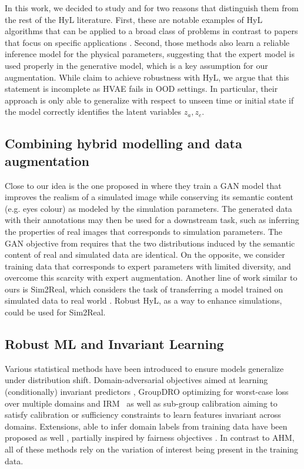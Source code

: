 In this work, we decided to study \citet{APHYNITY} and \citet{HVAE} for two reasons that distinguish them from the rest of the HyL literature. First, these are notable examples of HyL algorithms that can be applied to a broad class of problems in contrast to papers that focus on specific applications \citep{hl_2,hl_3}. Second, those methods also learn a reliable inference model for the physical parameters, suggesting that the expert model is used properly in the generative model, which is a key assumption for our augmentation. While \citet{HVAE} claim to achieve robustness with HyL, we argue that this statement is incomplete as HVAE fails in OOD settings. In particular, their approach is only able to generalize with respect to unseen time or initial state if the model correctly identifies the latent variables $z_a, z_e$.

\subsection{Combining hybrid modelling and data augmentation}
Close to our idea is the one proposed in \citet{gan_hl} where they train a GAN model that improves the realism of a simulated image while conserving its semantic content (e.g. eyes colour) as modeled by the simulation parameters. The generated data with their annotations may then be used for a downstream task, such as inferring the properties of real images that corresponds to simulation parameters. The GAN objective from \citet{gan_hl} requires that the two distributions induced by the semantic content of real and simulated data are identical. On the opposite, we consider training data that corresponds to expert parameters with limited diversity, and overcome this scarcity with expert augmentation. Another line of work similar to ours is Sim2Real, which considers the task of transferring a model trained on simulated data to real world \citep{sim2real-1, sim2real-2, sim2real-3}. Robust HyL, as a way to enhance simulations, could be used for Sim2Real.

\subsection{Robust ML and Invariant Learning}
Various statistical methods have been introduced to ensure models generalize under distribution shift. Domain-adversarial objectives aimed at learning (conditionally) invariant predictors \citep{ganin2016domain,zhang2017aspect,li2018deep}, GroupDRO \citep{groupDRO_ICLR} optimizing for worst-case loss over multiple domains and IRM~\citep{IRM} as well as sub-group calibration \citep{wald2021calibration} aiming to satisfy calibration or sufficiency constraints to learn features invariant across domains. Extensions, able to infer domain labels from training data have been proposed as well \citep{lahoti2020fairness,creager2021environment}, partially inspired by fairness objectives \citep{hebert2018multicalibration,kim2019multiaccuracy}. In contrast to AHM, all of these methods rely on the variation of interest being present in the training data.

